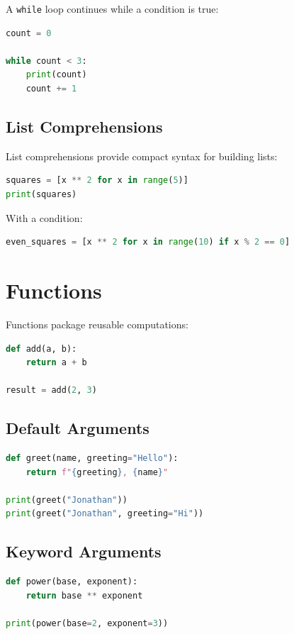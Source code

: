 \documentclass[12pt,oneside]{book}
\numberwithin{equation}{section}
\theoremstyle{definition}
\theoremstyle{plain}
\theoremstyle{remark}
\begin{document}
A \texttt{while} loop continues while a condition is true:
\begin{lstlisting}[language=Python]
count = 0

while count < 3:
    print(count)
    count += 1
\end{lstlisting}

\subsection{List Comprehensions}

List comprehensions provide compact syntax for building lists:
\begin{lstlisting}[language=Python]
squares = [x ** 2 for x in range(5)]
print(squares)
\end{lstlisting}

With a condition:
\begin{lstlisting}[language=Python]
even_squares = [x ** 2 for x in range(10) if x % 2 == 0]
\end{lstlisting}

\section{Functions}

Functions package reusable computations:
\begin{lstlisting}[language=Python]
def add(a, b):
    return a + b

result = add(2, 3)
\end{lstlisting}

\subsection{Default Arguments}

\begin{lstlisting}[language=Python]
def greet(name, greeting="Hello"):
    return f"{greeting}, {name}"

print(greet("Jonathan"))
print(greet("Jonathan", greeting="Hi"))
\end{lstlisting}

\subsection{Keyword Arguments}

\begin{lstlisting}[language=Python]
def power(base, exponent):
    return base ** exponent

print(power(base=2, exponent=3))
\end{lstlisting}
\end{document}
